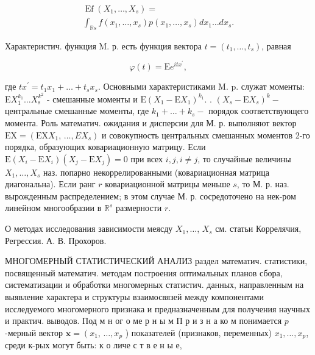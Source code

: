 \documentclass[10pt]{article}
\begin{document}
\[

\begin{gathered}

\operatorname{Ef}\left(X_{1}, \ldots, X_{s}\right)= \\

\int_{\mathbb{R} s} f\left(x_{1}, \ldots, x_{s}\right) p\left(x_{1}, \ldots, x_{s}\right) d x_{1} \ldots d x_{s} .

\end{gathered}

\]



Характеристич. функция M. р. есть функция вектора $t=\left(t_{1}, \ldots, t_{s}\right)$, равная



\[

\varphi(t)=\mathrm{E} e^{i t x^{\prime}},

\]



где $t x^{\prime}=t_{1} x_{1}+\ldots+t_{s} x_{s}$. Основными характеристиками M. p. служат моменты: $\mathrm{E} X_{1}^{k_{1}} \ldots X_{\mathrm{s}}^{k^{2}}$ - смешанные моменты и $\mathrm{E}\left(X_{1}-\mathrm{E} X_{1}\right)^{k_{1}}$. . $\left(X_{s}-\mathrm{E} X_{s}\right)^{k}-$ центральные смешанные моменты, где $k_{1}+\ldots+k_{s}-$ порядок соответствующего момента. Роль математич. ожидания и дисперсии для М. р. выполняют вектор $\mathrm{EX}=\left(\mathrm{EX} X_{1}\right.$, $\left.\ldots, E X_{s}\right)$ и совокупность центральных смешанных моментов 2-го порядка, образующих ковариационную матрицу. Если $\mathrm{E}\left(X_{i}-\mathrm{E} X_{i}\right)\left(X_{j}-\mathrm{E} X_{j}\right)=0$ при всех $i, j, i \neq j$, то случайные величины $X_{1}, \ldots, X_{s}$ наз. попарно некоррелированными (ковариационная матрица диагональна). Если ранг $r$ ковариационной матрицы меньше $s$, то М. р. наз. вырожденным распределением; в этом случае М. р. сосредоточено на нек-ром линейном многообразии в $\mathbb{R}^{s}$ размерности $r$.



О методах исследования зависимости меясду $X_{1}, \ldots$, $X_{s}$ см. статьи Коррелячия, Регрессия. А. В. Прохоров.



МНОГОМЕРНЫЙ СТАТИСТИЧЕСКИЙ АНАЛИЗ раздел математич. статистики, посвященный математич. методам построения оптимальных планов сбора, систематизации и обработки многомерных статистич. данных, направленным на выявление характера и структуры взаимосвязей между компонентами исследуемого многомерного признака и предназначенным для получения научных и практич. выводов. Под м н ог о ме р н ы м П р и з н а ко м понимается $p$-мерный вектор $\boldsymbol{x}=\left(x_{1}\right.$, $\ldots, x_{p}$ ) показателей (признаков, переменных) $x_{1}, \ldots, x_{p}$, среди к-рых могут быть: к о личе с т в е н ы е,
\end{document}

